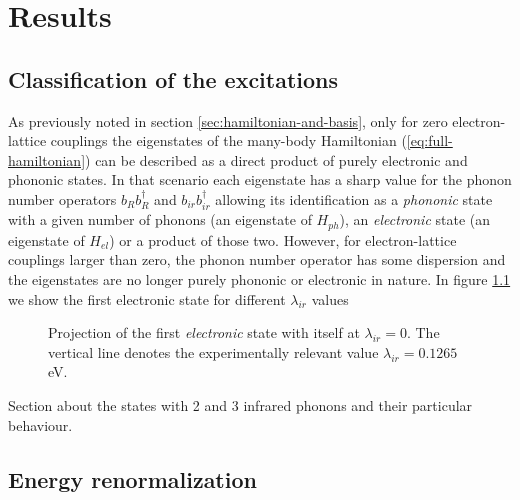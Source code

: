 \chapter{Results}
\label{chap:results}


\section{Classification of the excitations}
\label{sec:classification}

As previously noted in section \ref{sec:hamiltonian-and-basis}, only for zero electron-lattice couplings the eigenstates of the many-body Hamiltonian (\ref{eq:full-hamiltonian}) can be described as a direct product of purely electronic and phononic states. 
In that scenario each eigenstate has a sharp value for the phonon number operators $b_Rb^\dagger_R$ and $b_{ir}b^\dagger_{ir}$ allowing its identification as a \textit{phononic} state with a given number of phonons (an eigenstate of $H_{ph}$), an \textit{electronic} state (an eigenstate of $H_{el}$) or a product of those two.
However, for electron-lattice couplings larger than zero, the phonon number operator has some dispersion and the eigenstates are no longer purely phononic or electronic in nature.
In figure \ref{fig:electr-proj} we show the first electronic state for different $\lambda_{ir}$ values

\begin{figure}
  \centering
  
  \caption[Projection of the first \textit{electronic} state with itself at $\lambda_{ir}=0$.]
  {Projection of the first \textit{electronic} state with itself at $\lambda_{ir}=0$. 
    The vertical line denotes the experimentally relevant value $\lambda_{ir}=0.1265$ eV.}
  \label{fig:electr-proj}
\end{figure}



Section about the states with 2 and 3 infrared phonons and their particular behaviour.

\section{Energy renormalization}

